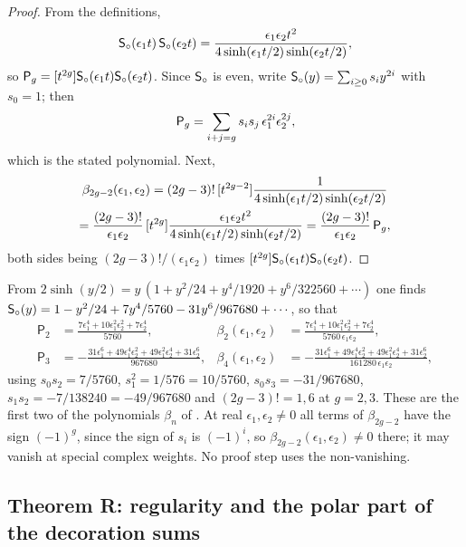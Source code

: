 \begin{proof}
From the definitions,
\[
\mathsf{S}_{\circ}(\epsilon_1t)\,\mathsf{S}_{\circ}(\epsilon_2t)=\frac{\epsilon_1\epsilon_2t^2}{4\sinh(\epsilon_1t/2)\sinh(\epsilon_2t/2)},
\]
so $\mathsf{P}_{g}=[t^{2g}]\mathsf{S}_{\circ}(\epsilon_1t)\mathsf{S}_{\circ}(\epsilon_2t)$. Since $\mathsf{S}_{\circ}$ is even, write $\mathsf{S}_{\circ}(y)=\sum_{i\geq 0}s_iy^{2i}$ with $s_0=1$; then
\[
\mathsf{P}_{g}=\sum_{i+j=g}s_is_j\,\epsilon_1^{2i}\epsilon_2^{2j},
\]
which is the stated polynomial. Next,
\begin{multline*}
\beta_{2g-2}(\epsilon_1,\epsilon_2)=(2g-3)!\,[t^{2g-2}]\frac{1}{4\sinh(\epsilon_1t/2)\sinh(\epsilon_2t/2)}\\
=\frac{(2g-3)!}{\epsilon_1\epsilon_2}\,[t^{2g}]\frac{\epsilon_1\epsilon_2t^2}{4\sinh(\epsilon_1t/2)\sinh(\epsilon_2t/2)}
=\frac{(2g-3)!}{\epsilon_1\epsilon_2}\,\mathsf{P}_{g},
\end{multline*}
both sides being $(2g-3)!/(\epsilon_1\epsilon_2)$ times $[t^{2g}]\mathsf{S}_{\circ}(\epsilon_1t)\mathsf{S}_{\circ}(\epsilon_2t)$.
\end{proof}

\begin{rmk}
\label{rmk:reg-betavalues}
From $2\sinh(y/2)=y\,(1+y^2/24+y^4/1920+y^6/322560+\cdots)$ one finds $\mathsf{S}_{\circ}(y)=1-y^2/24+7y^4/5760-31y^6/967680+\cdots$, so that
\begin{align*}
\mathsf{P}_2&=\frac{7\epsilon_1^4+10\epsilon_1^2\epsilon_2^2+7\epsilon_2^4}{5760},&
\beta_2(\epsilon_1,\epsilon_2)&=\frac{7\epsilon_1^4+10\epsilon_1^2\epsilon_2^2+7\epsilon_2^4}{5760\,\epsilon_1\epsilon_2},\\
\mathsf{P}_3&=-\frac{31\epsilon_1^6+49\epsilon_1^4\epsilon_2^2+49\epsilon_1^2\epsilon_2^4+31\epsilon_2^6}{967680},&
\beta_4(\epsilon_1,\epsilon_2)&=-\frac{31\epsilon_1^6+49\epsilon_1^4\epsilon_2^2+49\epsilon_1^2\epsilon_2^4+31\epsilon_2^6}{161280\,\epsilon_1\epsilon_2},
\end{align*}
using $s_0s_2=7/5760$, $s_1^2=1/576=10/5760$, $s_0s_3=-31/967680$, $s_1s_2=-7/138240=-49/967680$ and $(2g-3)!=1,6$ at $g=2,3$. These are the first two of the polynomials $\beta_n$ of \cite{BS}.  At real $\epsilon_1,\epsilon_2\neq 0$ all terms of $\beta_{2g-2}$ have the sign $(-1)^g$, since the sign of $s_i$ is $(-1)^i$, so $\beta_{2g-2}(\epsilon_1,\epsilon_2)\neq 0$ there; it may vanish at special complex weights. No proof step uses the non-vanishing.
\end{rmk}

\subsection{Theorem R: regularity and the polar part of the decoration sums}
\label{sec:reg-thmR}

